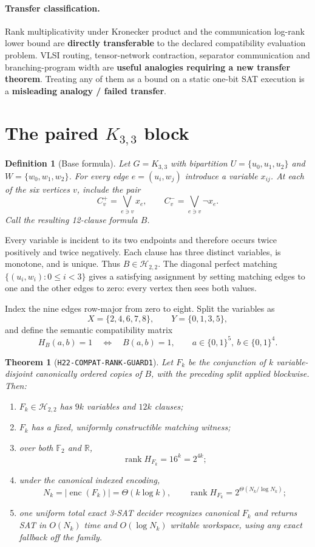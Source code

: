 \documentclass[11pt]{article}
\newtheorem{definition}{Definition}
\newtheorem{theorem}{Theorem}
\newcommand{\Htwo}{\mathcal H_{2,2}}
\begin{document}
\paragraph{Transfer classification.}
Rank multiplicativity under Kronecker product and the communication log-rank
lower bound are \textbf{directly transferable} to the declared compatibility
evaluation problem.  VLSI routing, tensor-network contraction, separator
communication and branching-program width are \textbf{useful analogies
requiring a new transfer theorem}.  Treating any of them as a bound on a
static one-bit SAT execution is a \textbf{misleading analogy / failed
transfer}.

\section{The paired $K_{3,3}$ block}

\begin{definition}[Base formula]
Let $G=K_{3,3}$ with bipartition
$U=\{u_0,u_1,u_2\}$ and $W=\{w_0,w_1,w_2\}$.  For every edge
$e=(u_i,w_j)$ introduce a variable $x_{ij}$.  At each of the six vertices
$v$, include the pair
\[
 C_v^+=\bigvee_{e\ni v}x_e,
 \qquad
 C_v^-=\bigvee_{e\ni v}\neg x_e.
\]
Call the resulting 12-clause formula $B$.
\end{definition}

Every variable is incident to its two endpoints and therefore occurs twice
positively and twice negatively.  Each clause has three distinct variables,
is monotone, and is unique.  Thus $B\in\Htwo$.  The diagonal perfect matching
$\{(u_i,w_i):0\le i<3\}$ gives a satisfying assignment by setting matching
edges to one and the other edges to zero: every vertex then sees both values.

Index the nine edges row-major from zero to eight.  Split the variables as
\[
 X=\{2,4,6,7,8\},\qquad Y=\{0,1,3,5\},
\]
and define the semantic compatibility matrix
\[
 H_B(a,b)=1\quad\Longleftrightarrow\quad B(a,b)=1,
 \qquad a\in\{0,1\}^{5},\ b\in\{0,1\}^{4}.
\]

\begin{theorem}[\texttt{H22-COMPAT-RANK-GUARD1}]
Let $F_k$ be the conjunction of $k$ variable-disjoint canonically ordered
copies of $B$, with the preceding split applied blockwise.  Then:
\begin{enumerate}
\item $F_k\in\Htwo$ has $9k$ variables and $12k$ clauses;
\item $F_k$ has a fixed, uniformly constructible matching witness;
\item over both $\mathbb F_2$ and $\mathbb R$,
\[
 \operatorname{rank}H_{F_k}=16^k=2^{4k};
\]
\item under the canonical indexed encoding,
\[
 N_k=|\operatorname{enc}(F_k)|=\Theta(k\log k),
 \qquad
 \operatorname{rank}H_{F_k}=2^{\Theta(N_k/\log N_k)};
\]
\item one uniform total exact 3-SAT decider recognizes canonical $F_k$ and
returns SAT in $O(N_k)$ time and $O(\log N_k)$ writable workspace, using any
exact fallback off the family.
\end{enumerate}
\end{theorem}
\end{document}
